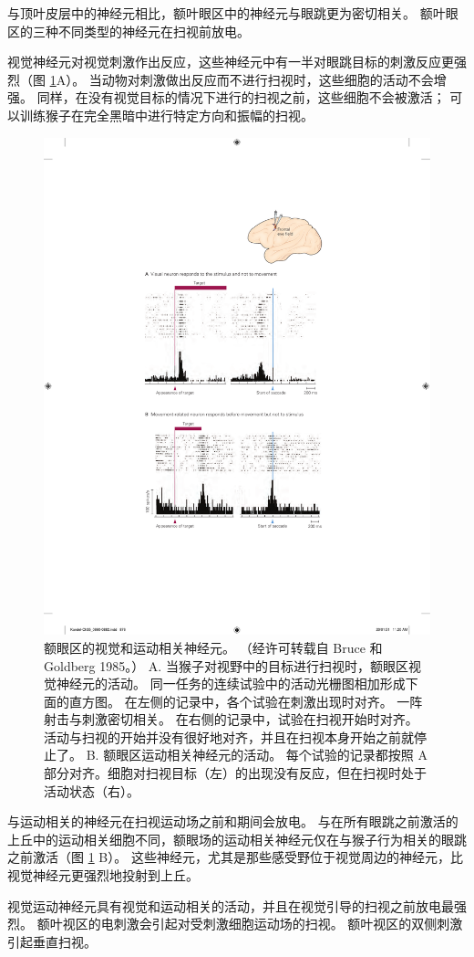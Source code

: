 与顶叶皮层中的神经元相比，额叶眼区中的神经元与眼跳更为密切相关。
额叶眼区的三种不同类型的神经元在扫视前放电。


视觉神经元对视觉刺激作出反应，这些神经元中有一半对眼跳目标的刺激反应更强烈（图 \ref{fig:35_13}A）。
当动物对刺激做出反应而不进行扫视时，这些细胞的活动不会增强。
同样，在没有视觉目标的情况下进行的扫视之前，这些细胞不会被激活；
可以训练猴子在完全黑暗中进行特定方向和振幅的扫视。


\begin{figure}[htbp]
	\centering
	\includegraphics[width=0.65\linewidth]{chap35/fig_35_13}
	\caption{额眼区的视觉和运动相关神经元。 （经许可转载自 Bruce 和 Goldberg 1985。） A. 当猴子对视野中的目标进行扫视时，额眼区视觉神经元的活动。 同一任务的连续试验中的活动光栅图相加形成下面的直方图。 在左侧的记录中，各个试验在刺激出现时对齐。 一阵射击与刺激密切相关。 在右侧的记录中，试验在扫视开始时对齐。 活动与扫视的开始并没有很好地对齐，并且在扫视本身开始之前就停止了。 B. 额眼区运动相关神经元的活动。 每个试验的记录都按照 A 部分对齐。细胞对扫视目标（左）的出现没有反应，但在扫视时处于活动状态（右）。}
	\label{fig:35_13}
\end{figure}


与运动相关的神经元在扫视运动场之前和期间会放电。
与在所有眼跳之前激活的上丘中的运动相关细胞不同，额眼场的运动相关神经元仅在与猴子行为相关的眼跳之前激活（图 \ref{fig:35_13} B）。
这些神经元，尤其是那些感受野位于视觉周边的神经元，比视觉神经元更强烈地投射到上丘。


视觉运动神经元具有视觉和运动相关的活动，并且在视觉引导的扫视之前放电最强烈。
额叶视区的电刺激会引起对受刺激细胞运动场的扫视。 额叶视区的双侧刺激引起垂直扫视。


